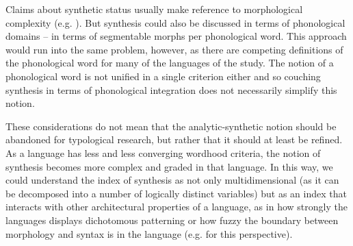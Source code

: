 \documentclass[output=paper,draftmode]{langscibook}
\begin{document}

Claims about synthetic status usually make reference to morphological complexity (e.g. \citealt{easterday2021syllable}). But synthesis could also be discussed in terms of phonological domains -- in terms of segmentable morphs per phonological word. This approach would run into the same problem, however, as there are competing definitions of the phonological word for many of the languages of the study. The notion of a phonological word is not unified in a single criterion either and so couching synthesis in terms of phonological integration does not necessarily simplify this notion.

These considerations do not mean that the analytic-synthetic notion should be abandoned for typological research, but rather that it should at least be refined. As a language has less and less converging wordhood criteria, the notion of synthesis becomes more complex and graded in that language. In this way, we could understand the index of synthesis as not only multidimensional (as it can be decomposed into a number of logically distinct variables) but as an index that interacts with other architectural properties of a language, as in how strongly the languages displays dichotomous patterning or how fuzzy the boundary between morphology and syntax is in the language (e.g. \citealt{tallman2018morphological} for this perspective). 

\end{document}
